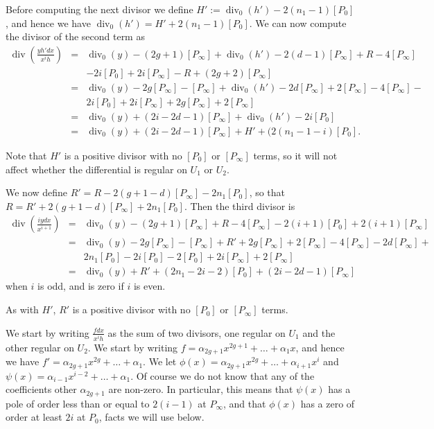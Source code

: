 \documentclass[draft, 11pt]{article} %
\theoremstyle{plain}
\theoremstyle{remark}
\DeclareMathOperator{\di}{div}
\begin{document}
Before computing the next divisor we define $H' := \di_0(h') - 2(n_1 -1)[P_0]$, and hence we have $\di_0(h') = H' + 2(n_1-1)[P_0]$.
We can now compute the divisor of the second term as
\begin{eqnarray*}
\di\left( \frac{yh'dx}{x^ih} \right)  & = & \di_0(y) - (2g+1)[P_\infty] + \di_0(h') - 2(d-1)[P_\infty] + R - 4[P_\infty] \\
& & - 2i[P_0] + 2i[P_\infty] - R + (2g+2)[P_\infty] \\
& = & \di_0(y) - 2g[P_\infty] - [P_\infty] + \di_0(h') - 2d[P_\infty] + 2[P_\infty] - 4[P_\infty] -\\
& & 2i[P_0] + 2i[P_\infty]+ 2g[P_\infty] + 2[P_\infty]  \\
& = & \di_0(y) + (2i-2d-1)[P_\infty] + \di_0(h') - 2i[P_0] \\
& = & \di_0(y) + (2i -2d -1) [P_\infty] + H' + (2(n_1 - 1 - i)[P_0].
\end{eqnarray*}

Note that $H'$ is a positive  divisor with no $[P_0]$ or $[P_\infty]$ terms, so it will not affect whether the differential is regular on $U_1$ or $U_2$.


We now define $R' = R - 2(g+1-d)[P_\infty] - 2n_1[P_0]$, so that $R = R' + 2(g+1-d)[P_\infty] + 2n_1[P_0]$.
Then the third divisor is
\begin{eqnarray*}
\di \left( \frac{iydx}{x^{i+1}} \right) & = & \di_0(y) - (2g+1)[P_\infty] + R - 4[P_\infty] - 2(i+1)[P_0] + 2(i+1)[P_\infty] \\
& = & \di_0(y) - 2g[P_\infty] - [P_\infty] + R' + 2g[P_\infty] + 2[P_\infty] - 4[P_\infty] - 2d[P_\infty] +\\
& &  2n_1[P_0] - 2i[P_0] -2[P_0] + 2i[P_\infty] +2[P_\infty]  \\
& = & \di_0(y) + R' + (2n_1 - 2i -2)[P_0] + (2i -2d -1)[P_\infty]
\end{eqnarray*}
when $i$ is odd, and is zero if $i$ is even.

As with $H'$, $R'$ is a positive divisor with no $[P_0]$ or $[P_\infty]$ terms.



We start by writing $\frac{fdx}{x^ih}$ as the sum of two divisors, one regular on $U_1$ and the other regular on $U_2$.
We start by writing $f = \alpha_{2g+1} x^{2g+1} + \ldots + \alpha_1x$, and hence we have $f' = \alpha_{2g+1}x^{2g} + \ldots + \alpha_1$.
We let $\phi (x) = \alpha_{2g+1}x^{2g} + \ldots + \alpha_{i+1}x^i$ and $\psi (x) = \alpha_{i-1}x^{i-2} + \ldots + \alpha_1$.
Of course we do not know that any of the coefficients other $\alpha_{2g+1}$ are non-zero.
In particular, this means that $\psi(x)$ has a pole of order less than or equal to $2(i-1)$ at $P_\infty$, and that $\phi(x)$ has a zero of order at least $2i$ at $P_0$, facts we will use below.
\end{document}
